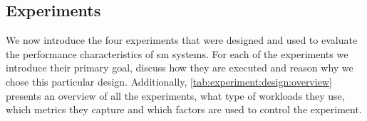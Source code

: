\subsection{Experiments}
\label{sec:experiments:design:overview}

We now introduce the four experiments that were designed and used to evaluate the performance characteristics of \gls{sm} systems. For each of the experiments we introduce their primary goal, discuss how they are executed and reason why we chose this particular design. Additionally, \cref{tab:experiment:design:overview} presents an overview of all the experiments, what type of workloads they use, which  metrics they capture and which factors  are used to control the experiment.




